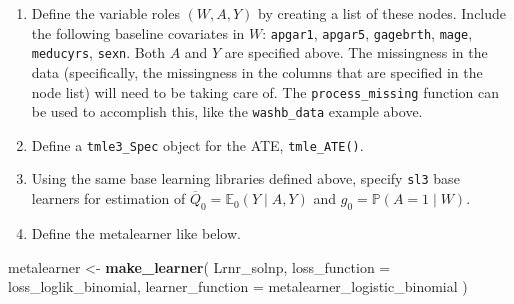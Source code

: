 \documentclass[12pt, krantz2,]{krantz}
\newenvironment{Shaded}{\begin{snugshade}}{\end{snugshade}}
\newcommand{\CommentTok}[1]{\textcolor[rgb]{0.37,0.37,0.37}{\textit{#1}}}
\newcommand{\DataTypeTok}[1]{\textcolor[rgb]{0.27,0.27,0.27}{#1}}
\newcommand{\DecValTok}[1]{\textcolor[rgb]{0.06,0.06,0.06}{#1}}
\newcommand{\KeywordTok}[1]{\textcolor[rgb]{0.27,0.27,0.27}{\textbf{#1}}}
\newcommand{\NormalTok}[1]{#1}
\newcommand{\OperatorTok}[1]{\textcolor[rgb]{0.43,0.43,0.43}{\textbf{#1}}}
\newcommand{\StringTok}[1]{\textcolor[rgb]{0.5,0.5,0.5}{#1}}
\providecommand{\tightlist}{%
  \setlength{\itemsep}{0pt}\setlength{\parskip}{0pt}}
\theoremstyle{definition}
\theoremstyle{definition}
\theoremstyle{definition}
\newcommand{\1}{\mathbbm{1}}
\begin{document}
\begin{Shaded}
\end{Shaded}

\begin{enumerate}
\def\labelenumi{\arabic{enumi}.}
\tightlist
\item
  Define the variable roles \((W,A,Y)\) by creating a list of these nodes.
  Include the following baseline covariates in \(W\): \texttt{apgar1}, \texttt{apgar5},
  \texttt{gagebrth}, \texttt{mage}, \texttt{meducyrs}, \texttt{sexn}. Both \(A\) and \(Y\) are specified
  above. The missingness in the data (specifically, the missingness in the
  columns that are specified in the node list) will need to be taking care of.
  The \texttt{process\_missing} function can be used to accomplish this, like the
  \texttt{washb\_data} example above.
\item
  Define a \texttt{tmle3\_Spec} object for the ATE, \texttt{tmle\_ATE()}.
\item
  Using the same base learning libraries defined above, specify \texttt{sl3} base
  learners for estimation of \(\overline{Q}_0 = \mathbb{E}_0(Y \mid A,Y)\) and
  \(g_0 = \mathbb{P}(A = 1 \mid W)\).
\item
  Define the metalearner like below.
\end{enumerate}

\begin{Shaded}
\begin{Highlighting}[]
\NormalTok{metalearner <-}\StringTok{ }\KeywordTok{make_learner}\NormalTok{(}
\NormalTok{  Lrnr_solnp,}
  \DataTypeTok{loss_function =}\NormalTok{ loss_loglik_binomial,}
  \DataTypeTok{learner_function =}\NormalTok{ metalearner_logistic_binomial}
\NormalTok{)}
\end{Highlighting}
\end{Shaded}
\end{document}
